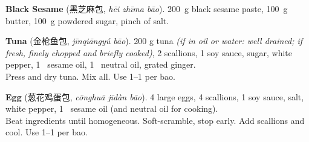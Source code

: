 \textbf{Black Sesame} (黑芝麻包, \textit{hēi zhīma bāo}).  200~g
black sesame paste, 100~g butter, 100~g powdered sugar, pinch of
salt.

\textbf{Tuna} (金枪鱼包, \textit{jīnqiāngyú bāo}).  200 g tuna
\textit{(if in oil or water: well drained; if fresh, finely chopped
  and briefly cooked)}, 2 scallions,
1\fracH\tsp{} soy sauce, \fracH\tsp{} sugar, white pepper, 1~\tsp{}
sesame oil, 1~\tsp{} neutral oil, \fracH\tsp{} grated ginger. \\
Press and dry tuna.  Mix all.  Use 1--1\fracH\tbsp{} per bao.

\textbf{Egg} (葱花鸡蛋包, \textit{cōnghuā jīdàn bāo}).  4 large eggs,
4 scallions, 1\fracH\tsp{} soy sauce,
\fracQ\tsp{} salt, white pepper, 1~\tsp{} sesame oil (and neutral oil
for cooking).  \\
Beat ingredients until homogeneous.  Soft-scramble, stop early.  Add
scallions and cool.  Use 1--1\fracH\tbsp{} per bao.

